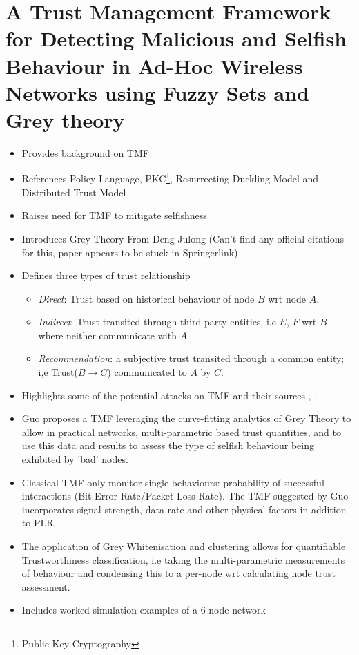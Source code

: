 \section{A Trust Management Framework for Detecting Malicious and Selfish Behaviour 
in Ad-Hoc Wireless Networks using Fuzzy Sets and Grey theory \citet*{Guo}}
\label{Guo}
\begin{itemize}
  \item Provides background on TMF
  \item References Policy Language, PKC\footnote{Public Key
  Cryptography}, Resurrecting Duckling Model and Distributed Trust Model
  \cite{Li2007}
  \item Raises need for TMF to mitigate selfishness
  \item Introduces Grey Theory From Deng Julong (Can't find any official
  citations for this, paper appears to be stuck in  Springerlink)
  \item Defines three types of trust relationship
  \begin{itemize}
    \item \emph{Direct}: Trust based on historical behaviour of node $B$ wrt
    node $A$.
    \item \emph{Indirect}: Trust transited through third-party entities, i.e
    $E$, $F$ wrt $B$ where neither communicate with $A$
    \item \emph{Recommendation}: a subjective trust transited through a common
    entity; i,e Trust($B\rightarrow C$) communicated to $A$ by $C$.
  \end{itemize}
  \item Highlights some of the potential attacks on TMF and their sources
  \cite{Sun2008}, \cite{Li2008}.
  \item Guo proposes a TMF leveraging the curve-fitting
  analytics of Grey Theory to allow in practical networks, multi-parametric
  based trust quantities, and to use this data and results to assess the type
  of selfish behaviour being exhibited by 'bad' nodes.
  \item Classical TMF only monitor single behaviours: probability of successful
  interactions (Bit Error Rate/Packet Loss Rate).
  The TMF suggested by Guo incorporates signal strength, data-rate and other
  physical factors in addition to PLR.
  \item The application of Grey Whitenisation and clustering allows for
  quantifiable Trustworthiness classification, i.e taking the multi-parametric
  measurements of behaviour and condensing this to a per-node wrt calculating
  node trust assessment.
  \item Includes worked simulation examples of a 6 node network
\end{itemize}

